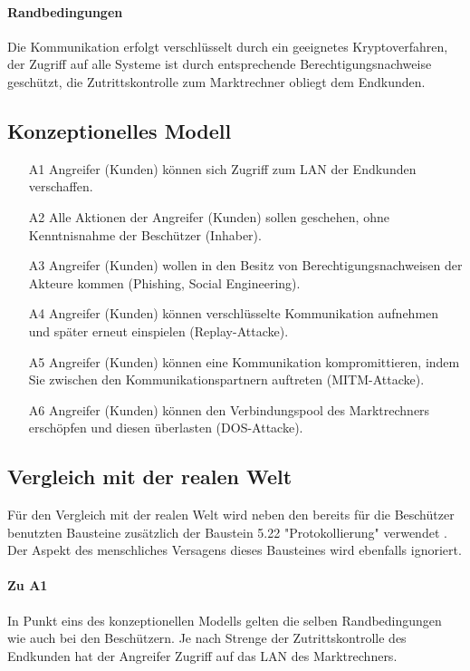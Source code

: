 \documentclass[11pt,a4paper]{report}
\begin{document}
\paragraph{Randbedingungen} Die Kommunikation erfolgt verschlüsselt durch ein geeignetes Kryptoverfahren, der Zugriff auf alle Systeme ist durch entsprechende Berechtigungsnachweise geschützt, die Zutrittskontrolle zum Marktrechner obliegt dem Endkunden.

\subsection{Konzeptionelles Modell}

\begin{enumerate}[leftmargin=*]
\item[A1] Angreifer (Kunden) können sich Zugriff zum LAN der Endkunden verschaffen.
\item[A2] Alle Aktionen der Angreifer (Kunden) sollen geschehen, ohne Kenntnisnahme der Beschützer (Inhaber).
\item[A3] Angreifer (Kunden) wollen in den Besitz von Berechtigungsnachweisen der Akteure kommen (Phishing, Social Engineering).
\item[A4] Angreifer (Kunden) können verschlüsselte Kommunikation aufnehmen und später erneut einspielen (Replay-Attacke).
\item[A5] Angreifer (Kunden) können eine Kommunikation kompromittieren, indem Sie zwischen den Kommunikationspartnern auftreten (MITM-Attacke).
\item[A6] Angreifer (Kunden) können den Verbindungspool des Marktrechners erschöpfen und diesen überlasten (DOS-Attacke).
\end{enumerate}

\subsection{Vergleich mit der realen Welt}

Für den Vergleich mit der realen Welt wird neben den bereits für die Beschützer benutzten Bausteine zusätzlich der Baustein 5.22 "Protokollierung" verwendet \cite{bsi_b5022}. Der Aspekt des menschliches Versagens dieses Bausteines wird ebenfalls ignoriert.

\paragraph{Zu A1} In Punkt eins des konzeptionellen Modells gelten die selben Randbedingungen wie auch bei den Beschützern. Je nach Strenge der Zutrittskontrolle des Endkunden hat der Angreifer Zugriff auf das LAN des Marktrechners.
\end{document}
